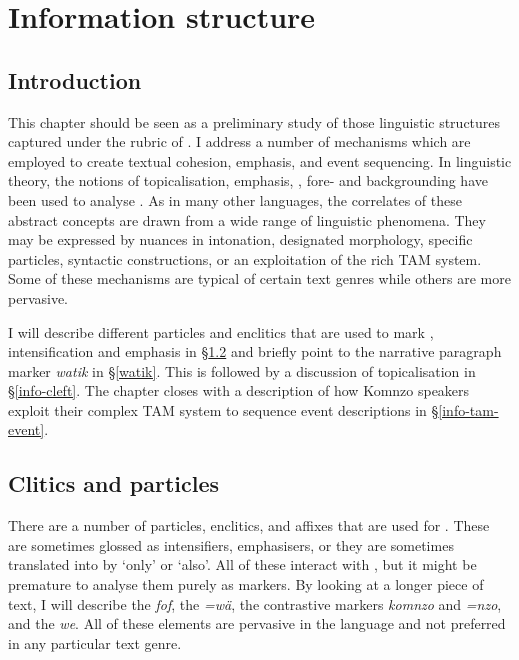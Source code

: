 
\chapter{Information structure} \label{cha:infostructure}

\section{Introduction} \label{intro-information-structure}

This chapter should be seen as a preliminary study of those linguistic structures captured under the rubric of . I address a number of mechanisms which are employed to create textual cohesion, emphasis, and event sequencing. In linguistic theory, the notions of topicalisation, emphasis, , fore- and backgrounding have been used to analyse . As in many other languages, the correlates of these abstract concepts are drawn from a wide range of linguistic phenomena. They may be expressed by nuances in intonation, designated morphology, specific particles, syntactic constructions, or an exploitation of the rich TAM system. Some of these mechanisms are typical of certain text genres while others are more pervasive.

I will describe different particles and enclitics that are used to mark , intensification and emphasis in {\S}\ref{info-foc-emph} and briefly point to the narrative paragraph marker \emph{watik} in {\S}\ref{watik}. This is followed by a discussion of topicalisation in {\S}\ref{info-cleft}. The chapter closes with a description of how Komnzo speakers exploit their complex TAM system to sequence event descriptions in {\S}\ref{info-tam-event}.

\section{Clitics and particles} \label{info-foc-emph}

There are a number of particles, enclitics, and affixes that are used for . These are sometimes glossed as intensifiers, emphasisers, or they are sometimes translated into  by `only' or `also'. All of these interact with , but it might be premature to analyse them purely as  markers. By looking at a longer piece of text, I will describe the  \emph{fof}, the   \emph{=wä}, the contrastive markers \emph{komnzo} and \emph{=nzo}, and the  \emph{we}. All of these elements are pervasive in the language and not preferred in any particular text genre.


